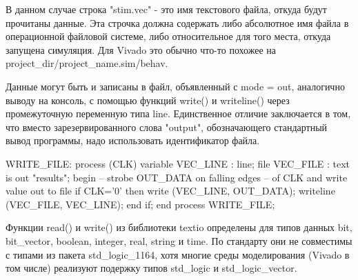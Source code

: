 В данном случае строка "stim.vec" - это имя текстового файла, откуда будут прочитаны данные. Эта строчка должна содержать либо абсолютное имя файла в операционной файловой системе, либо относительное для того места, откуда запущена симуляция. Для Vivado это обычно что-то похожее на project_dir/project_name.sim/behav.

Данные могут быть и записаны в файл, объявленный с mode =  out, аналогично выводу на консоль, с помощью функций write() и writeline() через промежуточную переменную типа line. Единственное отличие заключается в том, что вместо зарезервированного слова "output", обозначающего стандартный вывод программы, надо использовать идентификатор файла. 

 WRITE_FILE: process (CLK)
  variable VEC_LINE : line;
  file VEC_FILE : text is out "results";
begin
  -- strobe OUT_DATA on falling edges 
  -- of CLK and write value out to file
  if CLK='0' then
    write (VEC_LINE, OUT_DATA);
    writeline (VEC_FILE, VEC_LINE);
  end if; 
end process WRITE_FILE;


Функции read() и write() из библиотеки textio определены для типов данных bit, bit_vector, boolean, integer, real, string и time. По стандарту они не совместимы с типами из пакета std_logic_1164, хотя многие среды моделирования (Vivado в том числе) реализуют подержку типов std_logic и std_logic_vector. 